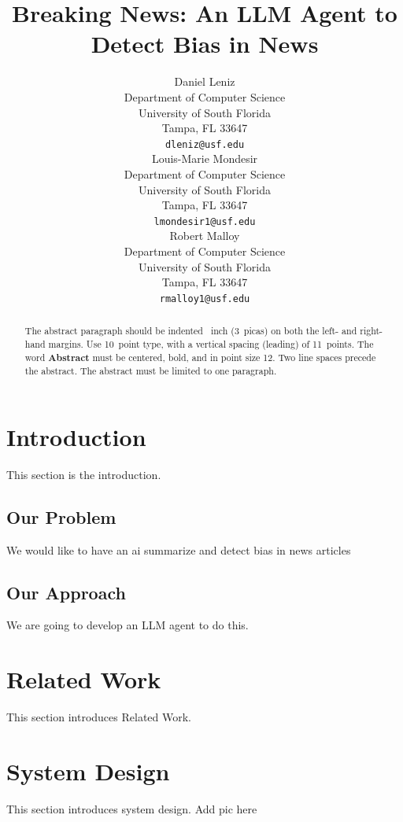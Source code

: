 \documentclass{article}
\title{Breaking News: An LLM Agent to Detect Bias in News}
\author{%
  Daniel Leniz\\
  Department of Computer Science\\
  University of South Florida\\
  Tampa, FL 33647 \\
  \texttt{dleniz@usf.edu} \\
  \And
  Louis-Marie Mondesir\\
  Department of Computer Science\\
  University of South Florida\\
  Tampa, FL 33647 \\
  \texttt{lmondesir1@usf.edu} \\
  \And
  Robert Malloy\\
  Department of Computer Science\\
  University of South Florida\\
  Tampa, FL 33647 \\
  \texttt{rmalloy1@usf.edu} \\
}
\begin{document}
\maketitle


\begin{abstract}
  The abstract paragraph should be indented ~inch (3~picas) on
  both the left- and right-hand margins. Use 10~point type, with a vertical
  spacing (leading) of 11~points.  The word \textbf{Abstract} must be centered,
  bold, and in point size 12. Two line spaces precede the abstract. The abstract
  must be limited to one paragraph.
\end{abstract}


\section{Introduction}

This section is the introduction.


\subsection{Our Problem}

We would like to have an ai summarize and detect bias in news articles


\subsection{Our Approach}

We are going to develop an LLM agent to do this.


\section {Related Work}

This section introduces Related Work. 

\section{System Design}

This section introduces system design. Add pic here
\end{document}
